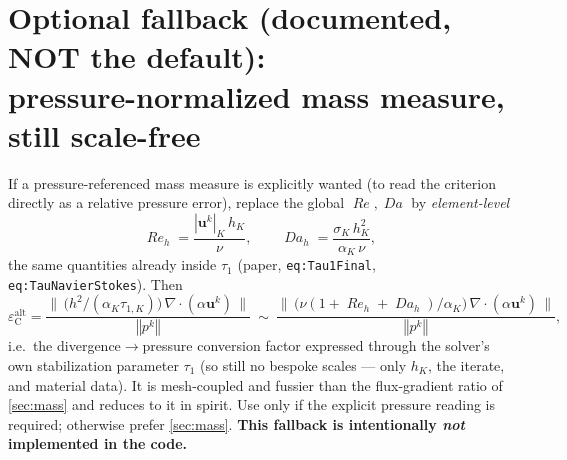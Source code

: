 \documentclass[11pt]{article}
\newcommand{\Reyn}{\operatorname{\mathit{Re}}}
\newcommand{\Damk}{\operatorname{\mathit{Da}}}
\newcommand{\bu}{\boldsymbol{u}}
\newcommand{\divg}{\nabla\!\cdot\!}
\newcommand{\norm}[1]{\left\Vert #1\right\Vert}
\newcommand{\epsC}{\varepsilon_{\mathrm C}}
\theoremstyle{plain}
\theoremstyle{remark}
\begin{document}
\section{Optional fallback (documented, NOT the default):\\
pressure-normalized mass measure, still scale-free}\label{sec:fallback}
If a pressure-referenced mass measure is explicitly wanted (to read the criterion
directly as a relative pressure error), replace the global $\Reyn,\Damk$ by
\emph{element-level}
\begin{equation}\label{eq:elemRe}
  \Reyn_h=\frac{|\bu^k|_K\,h_K}{\nu},
  \qquad
  \Damk_h=\frac{\sigma_K\,h_K^2}{\alpha_K\,\nu},
\end{equation}
the same quantities already inside $\tau_1$ (paper, \texttt{eq:Tau1Final},
\texttt{eq:TauNavierStokes}). Then
\begin{equation}\label{eq:epsCalt}
  \epsC^{\mathrm{alt}}
  =\frac{\big\|\,\big(h^2/(\alpha_K\tau_{1,K})\big)\,\divg(\alpha\bu^k)\,\big\|}
        {\norm{p^k}}
  \ \sim\
  \frac{\big\|\,\big(\nu(1+\Reyn_h+\Damk_h)/\alpha_K\big)\,\divg(\alpha\bu^k)\,\big\|}
        {\norm{p^k}},
\end{equation}
i.e.\ the divergence$\to$pressure conversion factor expressed through the
solver's own stabilization parameter $\tau_1$ (so still no bespoke scales --- only
$h_K$, the iterate, and material data). It is mesh-coupled and fussier than the
flux-gradient ratio of \cref{sec:mass} and reduces to it in spirit. Use only if
the explicit pressure reading is required; otherwise prefer \cref{sec:mass}.
\textbf{This fallback is intentionally \emph{not} implemented in the code.}

\end{document}
